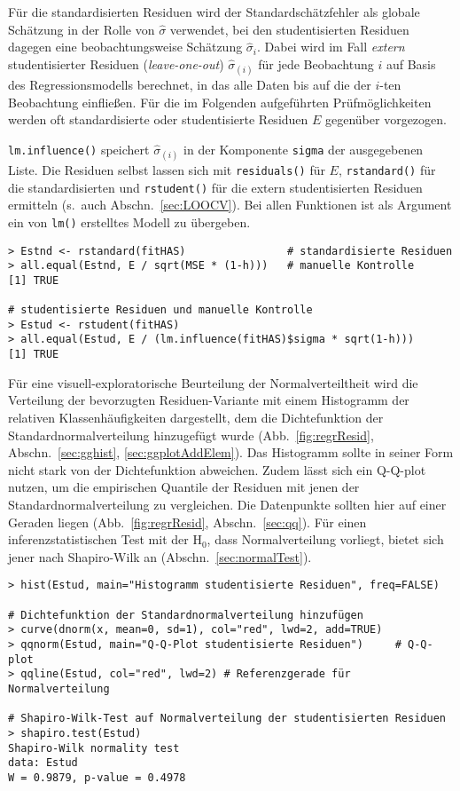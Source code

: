 Für die standardisierten Residuen wird der Standardschätzfehler als globale Schätzung in der Rolle von $\hat{\sigma}$ verwendet, bei den studentisierten Residuen dagegen eine beobachtungsweise Schätzung $\hat{\sigma}_{i}$. Dabei wird im Fall \emph{extern} studentisierter Residuen (\emph{leave-one-out}) $\hat{\sigma}_{(i)}$ für jede Beobachtung $i$ auf Basis des Regressionsmodells berechnet, in das alle Daten bis auf die der $i$-ten Beobachtung einfließen. Für die im Folgenden aufgeführten Prüfmöglichkeiten werden oft standardisierte oder studentisierte Residuen $E$ gegenüber vorgezogen.

\lstinline!lm.influence()! speichert $\hat{\sigma}_{(i)}$ in der Komponente \lstinline!sigma! der ausgegebenen Liste. Die Residuen selbst lassen sich mit \lstinline!residuals()! für $E$, \lstinline!rstandard()! für die standardisierten und \lstinline!rstudent()! für die extern studentisierten Residuen ermitteln (s.\ auch Abschn.\ \ref{sec:LOOCV}). Bei allen Funktionen ist als Argument ein von \lstinline!lm()! erstelltes Modell zu übergeben.
\begin{lstlisting}
> Estnd <- rstandard(fitHAS)                # standardisierte Residuen
> all.equal(Estnd, E / sqrt(MSE * (1-h)))   # manuelle Kontrolle
[1] TRUE

# studentisierte Residuen und manuelle Kontrolle
> Estud <- rstudent(fitHAS)
> all.equal(Estud, E / (lm.influence(fitHAS)$sigma * sqrt(1-h)))
[1] TRUE
\end{lstlisting}

Für eine visuell-exploratorische Beurteilung der Normalverteiltheit wird die Verteilung der bevorzugten Residuen-Variante mit einem Histogramm der relativen Klassenhäufigkeiten dargestellt, dem die Dichtefunktion der Standardnormalverteilung hinzugefügt wurde (Abb.\ \ref{fig:regrResid}, Abschn.\ \ref{sec:gghist}, \ref{sec:ggplotAddElem}). Das Histogramm sollte in seiner Form nicht stark von der Dichtefunktion abweichen. Zudem lässt sich ein Q-Q-plot nutzen, um die empirischen Quantile der Residuen mit jenen der Standardnormalverteilung zu vergleichen. Die Datenpunkte sollten hier auf einer Geraden liegen (Abb.\ \ref{fig:regrResid}, Abschn.\ \ref{sec:qq}). Für einen inferenzstatistischen Test mit der $\text{H}_{0}$, dass Normalverteilung vorliegt, bietet sich jener nach Shapiro-Wilk an (Abschn.\ \ref{sec:normalTest}).
\begin{lstlisting}
> hist(Estud, main="Histogramm studentisierte Residuen", freq=FALSE)

# Dichtefunktion der Standardnormalverteilung hinzufügen
> curve(dnorm(x, mean=0, sd=1), col="red", lwd=2, add=TRUE)
> qqnorm(Estud, main="Q-Q-Plot studentisierte Residuen")     # Q-Q-plot
> qqline(Estud, col="red", lwd=2) # Referenzgerade für Normalverteilung

# Shapiro-Wilk-Test auf Normalverteilung der studentisierten Residuen
> shapiro.test(Estud)
Shapiro-Wilk normality test
data: Estud
W = 0.9879, p-value = 0.4978
\end{lstlisting}

